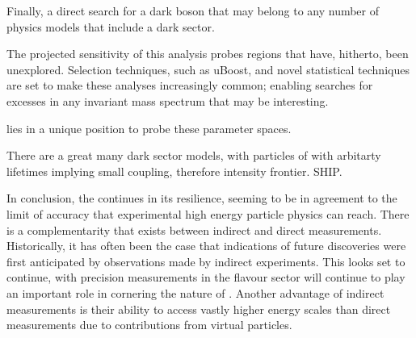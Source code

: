 
Finally, a direct search for a dark boson that may belong to any number of \bsm physics models that
include a dark sector.

The projected sensitivity of this analysis probes regions that have, hitherto, been unexplored.
Selection techniques, such as uBoost, and novel statistical techniques are set to make these
analyses increasingly common; enabling searches for excesses in any invariant mass spectrum that
may be interesting.

\lhcb lies in a unique position to probe these parameter spaces.


There are a great many dark sector models, with particles of with arbitarty lifetimes implying
small coupling, therefore intensity frontier.
SHIP.





In conclusion, the \sm continues in its resilience, seeming to be in agreement to the limit of
accuracy that experimental high energy particle physics can reach.
There is a complementarity that exists between indirect and direct measurements.
Historically, it has often been the case that indications of future discoveries were first
anticipated by observations made by indirect experiments.
This looks set to continue,
with precision measurements in the flavour sector will continue to play an important role in
cornering the nature of \np.
Another advantage of indirect measurements is their ability to access vastly higher energy scales
than direct measurements due to contributions from virtual particles.

